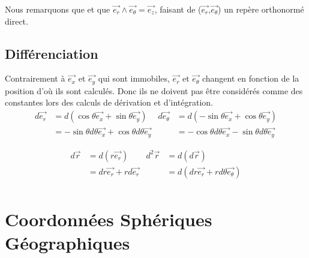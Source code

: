 \documentclass{report}
\begin{document}
Nous remarquons que  et que $\overrightarrow{e_r}\wedge\overrightarrow{e_\theta}=\overrightarrow{e_z}$, faisant de ($\overrightarrow{e_r}$,$\overrightarrow{e_\theta}$) un repère orthonormé direct.

\subsection{Différenciation}

Contrairement à $\overrightarrow{e_x}$ et $\overrightarrow{e_y}$ qui sont immobiles, $\overrightarrow{e_r}$ et $\overrightarrow{e_\theta}$ changent en fonction de la position d'où ils sont calculés. Donc ils ne doivent pas être considérés comme des constantes lors des calculs de dérivation et d'intégration.
\begin{align*}
d\overrightarrow{e_r}&=d\left(\cos\theta\overrightarrow{e_x}+\sin\theta\overrightarrow{e_y}\right)&d\overrightarrow{e_\theta}&=d\left(-\sin\theta\overrightarrow{e_x}+\cos\theta\overrightarrow{e_y}\right)\\
&=-\sin\theta d\theta\overrightarrow{e_x}+\cos\theta d\theta\overrightarrow{e_y}&&=-\cos\theta d\theta\overrightarrow{e_x}-\sin\theta d\theta\overrightarrow{e_y}
\end{align*}
\begin{center}
\end{center}

\begin{align*}
d\overrightarrow{r}&=d\left(r\overrightarrow{e_r}\right)&d^2\overrightarrow{r}&=d\left(d\overrightarrow{r}\right)\\
&=dr\overrightarrow{e_r}+rd\overrightarrow{e_r}&&=d\left(dr\overrightarrow{e_r}+rd\theta\overrightarrow{e_\theta}\right)\\
\end{align*}


\clearpage
\section{Coordonnées Sphériques Géographiques}
\end{document}
